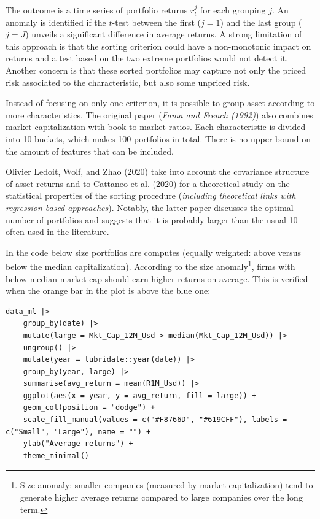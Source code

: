 The outcome is a time series of portfolio returns $r_{t}^{j}$ for each grouping $j$. An anomaly is identified if the $t$-test between the first ($j=1$) and the last group ($j=J$) unveils a significant difference in average returns.  A strong limitation of this approach is that the sorting criterion could have a non-monotonic impact on returns and a test based on the two extreme portfolios would not detect it. Another concern is that these sorted portfolios may capture not only the priced risk associated to the characteristic, but also some unpriced risk.

Instead of focusing on only one criterion, it is possible to group asset according to more characteristics. The original paper (\textit{Fama and French (1992)}) also combines market capitalization with book-to-market ratios. Each characteristic is divided into 10 buckets, which makes 100 portfolios in total. There is no upper bound on the amount of features that can be included.

Olivier Ledoit, Wolf, and Zhao (2020) take into account the covariance structure of asset returns and to Cattaneo et al. (2020) for a theoretical study on the statistical properties of the sorting procedure (\textit{including theoretical links with regression-based approaches}). Notably, the latter paper discusses the optimal number of portfolios and suggests that it is probably larger than the usual 10 often used in the literature.

In the code below size portfolios are computes (equally weighted: above versus below the median capitalization). According to the size anomaly\footnote{Size anomaly: smaller companies (measured by market capitalization) tend to generate higher average returns compared to large companies over the long term.}, firms with below median market cap should earn higher returns on average. This is verified when the orange bar in the plot is above the blue one:

\begin{lstlisting}
data_ml |> 
    group_by(date) |> 
    mutate(large = Mkt_Cap_12M_Usd > median(Mkt_Cap_12M_Usd)) |> 
    ungroup() |> 
    mutate(year = lubridate::year(date)) |> 
    group_by(year, large) |> 
    summarise(avg_return = mean(R1M_Usd)) |> 
    ggplot(aes(x = year, y = avg_return, fill = large)) + 
    geom_col(position = "dodge") + 
    scale_fill_manual(values = c("#F8766D", "#619CFF"), labels = c("Small", "Large"), name = "") + 
    ylab("Average returns") +
    theme_minimal()
\end{lstlisting}

